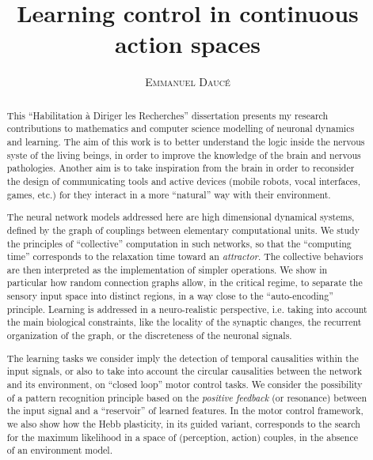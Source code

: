\documentclass[11pt]{article}
\title{\Huge \textbf{Learning control in continuous action spaces} }
\author{\textsc{Emmanuel Daucé}}%
\begin{document}
\maketitle
\begin{abstract}


This ``Habilitation à Diriger les Recherches'' dissertation presents my research contributions to   
mathematics and computer science modelling of neuronal dynamics and learning. 
The aim of this work is to better understand the logic inside the nervous syste
of the living beings, in order to improve the knowledge of the brain and nervous pathologies.
Another aim is to take inspiration from the brain in order to reconsider the design of communicating tools and active 
devices (mobile robots, vocal interfaces, games, etc.)
for they interact in a more ``natural'' way with their environment.


The neural network models addressed here are high dimensional dynamical systems,
defined by the graph of couplings between elementary computational units. 
We study the principles of ``collective'' computation
in such networks, so that the ``computing time'' corresponds to the relaxation time
toward an \textit{attractor}.
The collective behaviors are then interpreted as the implementation of simpler operations.
We show in particular how random connection graphs allow,  
in the critical regime, to separate the sensory input space 
into distinct regions, in a way close to the ``auto-encoding'' principle. 
Learning is addressed in a
neuro-realistic perspective, i.e. taking into account the main biological constraints, 
like the locality of the synaptic changes, the recurrent organization 
of the graph, or the discreteness 
of the neuronal signals.

The learning tasks we consider imply the detection of
temporal causalities within the input signals, or also 
to take into account the circular causalities between the network and its environment,
on ``closed loop'' motor control tasks.
We consider the possibility of a pattern recognition principle 
based on the \textit{positive feedback} (or resonance) between the
input signal and a ``reservoir'' of learned features. 
In the motor control framework, we also show how the Hebb plasticity,
in its guided variant, corresponds to the search for the maximum likelihood in a space of  
(perception, action) couples, in the absence of an environment model.



\end{abstract}
\end{document}
